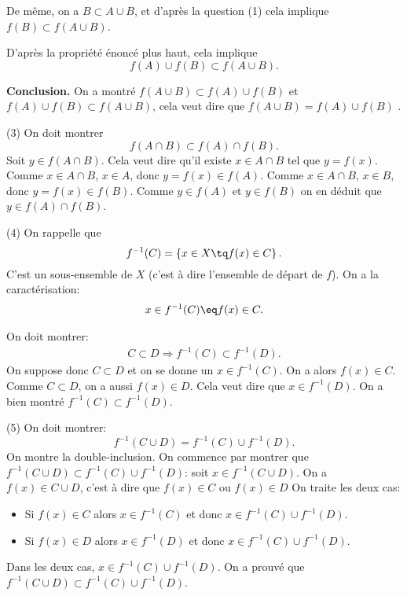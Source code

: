 \documentclass[12pt, a4paper,oneside]{article} %
\begin{document}
De même,
on a $ B \subset A \cup B $,
et d'après la question (1)
cela implique
$ f(B) \subset f(A \cup B)$.

D'après la propriété énoncé plus haut,
cela implique
\begin{equation}
	f(A)
	\cup f(B)
	\subset
	f( A \cup B)
	.
\end{equation}

\textbf{Conclusion.}
On a montré 
$ f(A \cup B) \subset f(A) \cup f(B) $
et
$
f(A)
\cup f(B)
\subset
f( A \cup B)
$,
cela veut dire que
$ f(A \cup B) = f(A) \cup f(B) $
.

(3)
On doit montrer
\begin{equation}
	f(A \cap B)
	\subset
	f(A)
	\cap
	f(B)
	.
\end{equation}
Soit $ y \in f( A \cap B) $.
Cela veut dire qu'il existe
$ x \in A \cap B $
tel que
$ y = f(x) $.
Comme $ x \in A \cap B $,
$ x \in A $,
donc $ y = f(x) \in f(A) $.
Comme $ x \in A \cap B $,
$ x \in B $,
donc $ y = f(x) \in f(B) $.
Comme $ y \in f(A) $
et $ y \in f(B) $
on en déduit que
$ y \in f(A) \cap f(B) $.

(4) On rappelle que
\begin{equation}
	f^{-1}(C)
	=
	\left\{ 
	x \in X
	\tq
	f(x) \in C
	\right\}
	.
\end{equation}
C'est un sous-ensemble de
$ X $ (c'est à dire l'ensemble de départ de $ f $).
On a la caractérisation:
\begin{align}
	x \in	
	f^{-1}(C)
	\eq
	f(x) \in C
	.
\end{align}

On doit montrer:
\begin{align}
	C \subset D
	\Rightarrow
	f^{-1} (C)
	\subset
	f^{-1} (D)
	.
\end{align}
On suppose donc
$ C \subset D $
et
on se donne un 
$ x \in f^{-1} (C) $.
On a alors
$ f(x) \in C $.
Comme $ C \subset D $,
on a aussi
$ f(x) \in D $.
Cela veut dire que
$ x \in f^{-1} (D) $.
On a bien montré
$ f^{-1} (C) \subset f^{-1} (D) $.

(5) On doit montrer:
\begin{equation}
	f^{-1} (C \cup D)
	=
	f^{-1} (C) \cup f^{-1}(D)
	.
\end{equation}
On montre la double-inclusion.
On commence par montrer que
$ 
f^{-1} (C \cup D)
\subset
f^{-1} (C) \cup f^{-1}(D)
$:
soit
$ x \in
f^{-1} (C \cup D)$.
On a
$ f(x) \in C \cup D $,
c'est à dire que
$ f(x) \in C$
ou
$ f(x) \in D $
On traite les deux cas:
\begin{itemize}
	\item Si $ f(x) \in C $
		alors $ x \in f^{-1}(C) $
		et donc
		$ x \in f^{-1} (C) \cup f^{-1} (D) $.
	\item Si $ f(x) \in D $
		alors $ x \in f^{-1}(D) $
		et donc
		$ x \in f^{-1} (C) \cup f^{-1} (D) $.
\end{itemize}
Dans les deux cas,
$ x \in f^{-1} (C) \cup f^{-1} (D) $.
On a prouvé que
$
f^{-1} (C \cup D)
\subset
f^{-1} (C) \cup f^{-1}(D)
$.
\end{document}
